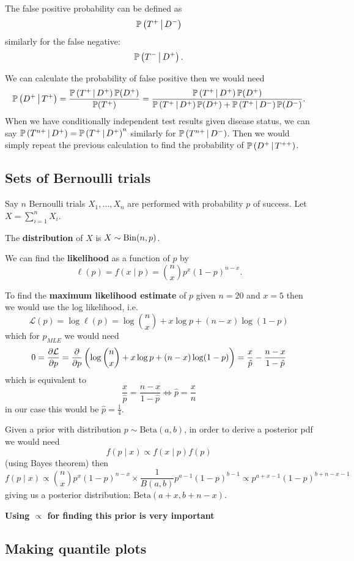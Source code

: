 \documentclass[10pt, a4paper]{article}
\begin{document}
The false positive probability can be defined as
\[
\cP{T ^ {+}}{D ^ {-}}
\]
similarly for the false negative:
\[
\cP{T ^ {-}}{D ^ {+}}.
\]

We can calculate the probability of false positive then we would need
\[
\cP{D ^ {+}}{T ^ {+}} = \frac{\cP{T ^ {+}}{D ^ {+}}\P(D ^ {+})}{\P(T ^ {+})} = \frac{\cP{T ^ {+}}{D ^ {+}}\P(D ^ {+})}{\cP{T ^ {+}}{D ^ {+}}\P(D ^ {+}) + \cP{T ^ {+}}{D ^ {-}}\P(D ^ {-})}.
\]
When we have conditionally independent test results given disease status,
we can say $\cP{T ^ {n+}}{D ^ {+}} = \cP{T ^ {+}}{D ^ {+}} ^ n$ similarly for $\cP{T ^ {n+}}{D ^ {-}}$.
Then we would simply repeat the previous calculation to find the probability of $\cP{D ^ {+}}{T ^ {++}}$.

\subsection{Sets of Bernoulli trials}
Say $n$ Bernoulli trials $X_1, \dotsc, X_n$ are performed with probability $p$ of success.
Let $X = \sum_{i = 1}^{n}X_i$.

The \textbf{distribution} of $X$ is $X \sim \Bin(n, p)$.

We can find the \textbf{likelihood} as a function of $p$ by
\[
\ell(p) = f(x\mid p) = \binom{n}{x}p ^ x(1 - p) ^ {n - x}.
\]

To find the \textbf{maximum likelihood estimate} of $p$ given $n = 20$ and $x = 5$ then we would use the log likelihood,
i.e.
\[
\mathcal{L}(p) = \log{\ell(p)} = \log{\binom{n}{x}} + x\log{p} + (n - x)\log(1 - p)
\]
which for $p_{MLE}$ we would need
\[
0 = \pd[\mathcal{L}]{p} = \pd{p}\left(\log{\binom{n}{x}} + x\log{p} + (n - x)\log(1 - p)\right) = \frac{x}{\hat{p}} - \frac{n - x}{1 - \hat{p}}
\]
which is equivalent to
\[
\frac{x}{\hat{p}} = \frac{n - x}{1 - \hat{p}} \iff \hat{p} = \frac{x}{n}
\]
in our case this would be $\hat{p} = \frac{1}{4}$.


Given a prior with distribution $p \sim \mathrm{Beta}(a, b)$,
in order to derive a posterior pdf we would need
\[
f(p\mid x) \propto f(x\mid p)f(p)
\]
(using Bayes theorem)
then
\[
f(p \mid x) \propto \binom{n}{x}p ^ x(1 - p) ^ {n - x}\times\frac{1}{B(a, b)}p ^ {a - 1}(1 - p) ^ {b - 1}\propto p ^ {a + x - 1}(1 - p) ^ {b + n - x - 1}
\]
giving us a posterior distribution:
$\mathrm{Beta}(a + x, b + n - x)$.



\textbf{Using $\propto$ for finding this prior is very important}


\subsection{Making quantile plots}
\end{document}
